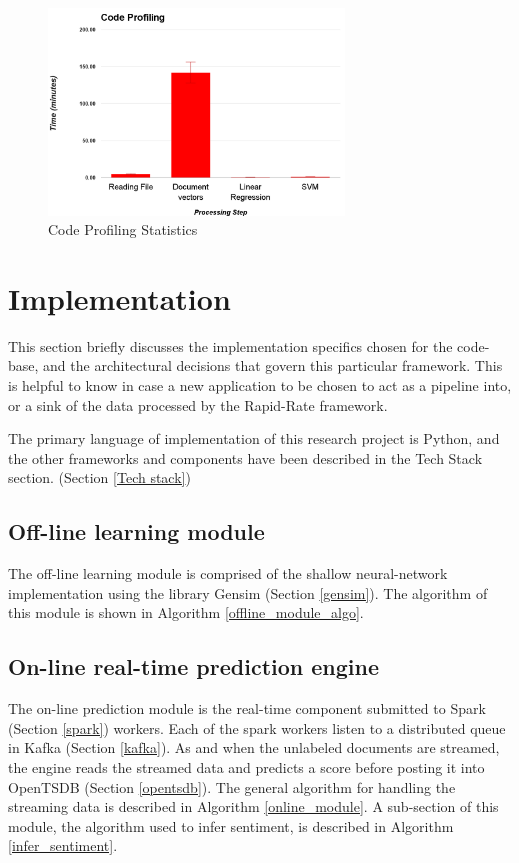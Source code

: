 \documentclass[conference]{IEEEtran}
\begin{document}
\begin{figure}[ht] 
    \centering
    \includegraphics[width=0.7\textwidth]{images/code_profiling.png}
    \caption{Code Profiling Statistics}
    \label{fig:code-profiling}
\end{figure}

\section{Implementation}
    This section briefly discusses the implementation specifics chosen for the code-base, and the architectural decisions that govern this particular framework. 
    This is helpful to know in case a new application to be chosen to act as a pipeline into, or a sink of the data processed by the Rapid-Rate framework.

    The primary language of implementation of this research project is Python, and the other frameworks and components have been described in the Tech Stack section. (Section \ref{Tech stack})

    \subsection{Off-line learning module} \label{offline_module}
        The off-line learning module is comprised of the shallow neural-network implementation using the library Gensim (Section \ref{gensim}). 
        The algorithm of this module is shown in Algorithm \ref{offline_module_algo}.

    \subsection{On-line real-time prediction engine}
        The on-line prediction module is the real-time component submitted to Spark (Section \ref{spark}) workers. 
        Each of the spark workers listen to a distributed queue in Kafka (Section \ref{kafka}). 
        As and when the unlabeled documents are streamed, the engine reads the streamed data and predicts a score before posting it into OpenTSDB (Section \ref{opentsdb}). 
        The general algorithm for handling the streaming data is described in Algorithm \ref{online_module}. 
        A sub-section of this module, the algorithm used to infer sentiment, is described in Algorithm \ref{infer_sentiment}.
\end{document}
